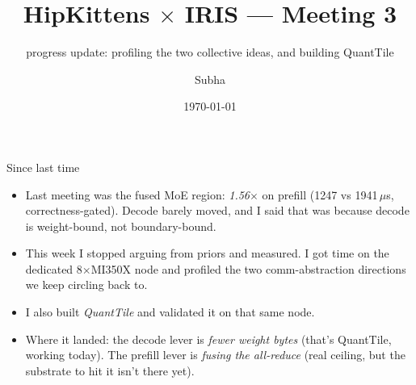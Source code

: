 \documentclass[pdf,aspectratio=169]{beamer}
\title[HK $\times$ IRIS m3]{HipKittens $\times$ IRIS --- Meeting 3}
\subtitle{progress update: profiling the two collective ideas, and building QuantTile}
\newcommand{\empy}[1]{{\color{darkorange}\emph{#1}}}
\newcommand{\empr}[1]{{\color{cardinalred}\emph{#1}}}
\begin{document}
\author[Subha]{Subha}
\date{\today}

\begin{noheadline}
\begin{frame}\maketitle\end{frame}
\end{noheadline}

\begin{frame}{Since last time}
\small
\begin{itemize}
  \item Last meeting was the fused MoE region: \empr{1.56$\times$} on prefill (1247 vs 1941\,$\mu$s, correctness-gated). Decode barely moved, and I said that was because decode is weight-bound, not boundary-bound.
  \item This week I stopped arguing from priors and measured. I got time on the dedicated 8$\times$MI350X node and profiled the two comm-abstraction directions we keep circling back to.
  \item I also built \empy{QuantTile} and validated it on that same node.
  \item Where it landed: the decode lever is \empy{fewer weight bytes} (that's QuantTile, working today). The prefill lever is \empy{fusing the all-reduce} (real ceiling, but the substrate to hit it isn't there yet).
\end{itemize}
\end{frame}
\end{document}
